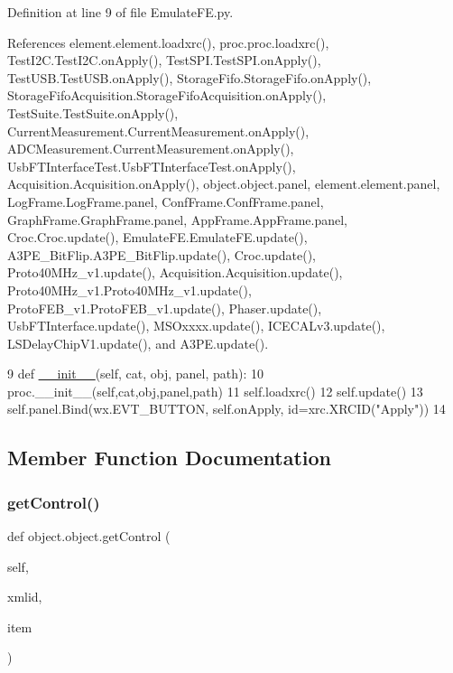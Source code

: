 Definition at line 9 of file Emulate\+F\+E.\+py.



References element.\+element.\+loadxrc(), proc.\+proc.\+loadxrc(), Test\+I2\+C.\+Test\+I2\+C.\+on\+Apply(), Test\+S\+P\+I.\+Test\+S\+P\+I.\+on\+Apply(), Test\+U\+S\+B.\+Test\+U\+S\+B.\+on\+Apply(), Storage\+Fifo.\+Storage\+Fifo.\+on\+Apply(), Storage\+Fifo\+Acquisition.\+Storage\+Fifo\+Acquisition.\+on\+Apply(), Test\+Suite.\+Test\+Suite.\+on\+Apply(), Current\+Measurement.\+Current\+Measurement.\+on\+Apply(), A\+D\+C\+Measurement.\+Current\+Measurement.\+on\+Apply(), Usb\+F\+T\+Interface\+Test.\+Usb\+F\+T\+Interface\+Test.\+on\+Apply(), Acquisition.\+Acquisition.\+on\+Apply(), object.\+object.\+panel, element.\+element.\+panel, Log\+Frame.\+Log\+Frame.\+panel, Conf\+Frame.\+Conf\+Frame.\+panel, Graph\+Frame.\+Graph\+Frame.\+panel, App\+Frame.\+App\+Frame.\+panel, Croc.\+Croc.\+update(), Emulate\+F\+E.\+Emulate\+F\+E.\+update(), A3\+P\+E\+\_\+\+Bit\+Flip.\+A3\+P\+E\+\_\+\+Bit\+Flip.\+update(), Croc.\+update(), Proto40\+M\+Hz\+\_\+v1.\+update(), Acquisition.\+Acquisition.\+update(), Proto40\+M\+Hz\+\_\+v1.\+Proto40\+M\+Hz\+\_\+v1.\+update(), Proto\+F\+E\+B\+\_\+v1.\+Proto\+F\+E\+B\+\_\+v1.\+update(), Phaser.\+update(), Usb\+F\+T\+Interface.\+update(), M\+S\+Oxxxx.\+update(), I\+C\+E\+C\+A\+Lv3.\+update(), L\+S\+Delay\+Chip\+V1.\+update(), and A3\+P\+E.\+update().


\begin{DoxyCode}
9     \textcolor{keyword}{def }\hyperlink{classwrapper_1_1ModuleDictWrapper_a9a7a794150502f51df687831583e13b9}{\_\_init\_\_}(self, cat, obj, panel, path):
10         proc.\_\_init\_\_(self,cat,obj,panel,path)
11         self.loadxrc()
12         self.update()
13         self.panel.Bind(wx.EVT\_BUTTON, self.onApply, id=xrc.XRCID(\textcolor{stringliteral}{"Apply"}))
14 
\end{DoxyCode}


\subsection{Member Function Documentation}
\mbox{\label{classobject_1_1object_a54a55487254a96ed2fe367439c41391f}} 
\subsubsection{\texorpdfstring{get\+Control()}{getControl()}\hspace{0.1cm}{\footnotesize\ttfamily [1/2]}}
{\footnotesize\ttfamily def object.\+object.\+get\+Control (\begin{DoxyParamCaption}\item[{}]{self,  }\item[{}]{xmlid,  }\item[{}]{item }\end{DoxyParamCaption})\hspace{0.3cm}{\ttfamily [inherited]}}

